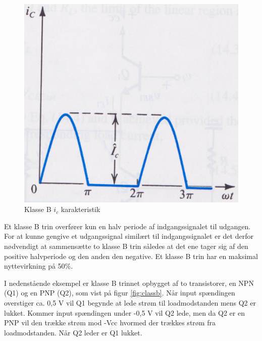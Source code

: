 \begin{figure}[h]
\centering
\includegraphics[scale=.35]{indledende_analyse/klasser/klasseb.png}
\caption{Klasse B $i_c$ karakteristik}
\label{fig:klasseb}
\end{figure}

Et klasse B trin overfører kun en halv periode af indgangssignalet til udgangen. For at kunne gengive et udgangssignal similært til indgangssignalet er det derfor nødvendigt at sammensætte to klasse B trin således at det ene tager sig af den positive halvperiode og den anden den negative.
Et klasse B trin har en maksimal nyttevirkning på 50\%.

I nedenstående eksempel er klasse B trinnet opbygget af to transistorer, en NPN (Q1) og en PNP (Q2), som vist på figur \ref{fig:classb}. Når input spændingen overstiger ca. 0,5 V vil Q1 begynde at lede strøm til loadmodstanden mens Q2 er lukket. Kommer input spændingen under -0,5 V vil Q2 lede, men da Q2 er en PNP vil den trække strøm mod -Vcc hvormed der trækkes strøm fra loadmodstanden. Når Q2 leder er Q1 lukket. 



